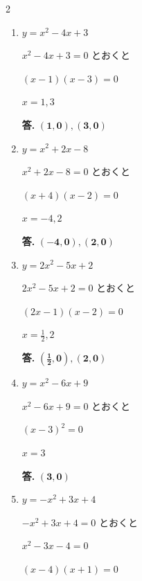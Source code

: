 \documentclass[a4paper, 11pt]{jsarticle}
\begin{document}
\begin{multicols*}{2}
\begin{enumerate}[label=(\arabic*)]
    \item $y = x^2 - 4x + 3$
    
    {\color{red}
    $x^2 - 4x + 3 = 0$ とおくと
    
    $(x - 1)(x - 3) = 0$
    
    $x = 1, 3$
    
    \textbf{答.} $\boldsymbol{(1, 0), (3, 0)}$
    }
    \vspace*{\fill}

    \item $y = x^2 + 2x - 8$
    
    {\color{red}
    $x^2 + 2x - 8 = 0$ とおくと
    
    $(x + 4)(x - 2) = 0$
    
    $x = -4, 2$
    
    \textbf{答.} $\boldsymbol{(-4, 0), (2, 0)}$
    }
    \vspace*{\fill}

    \item $y = 2x^2 - 5x + 2$
    
    {\color{red}
    $2x^2 - 5x + 2 = 0$ とおくと
    
    $(2x - 1)(x - 2) = 0$
    
    $x = \frac{1}{2}, 2$
    
    \textbf{答.} $\boldsymbol{\left(\frac{1}{2}, 0\right), (2, 0)}$
    }
    \vspace*{\fill}

    \item $y = x^2 - 6x + 9$
    
    {\color{red}
    $x^2 - 6x + 9 = 0$ とおくと
    
    $(x - 3)^2 = 0$
    
    $x = 3$
    
    \textbf{答.} $\boldsymbol{(3, 0)}$
    }
    \vspace*{\fill}

    \item $y = -x^2 + 3x + 4$
    
    {\color{red}
    $-x^2 + 3x + 4 = 0$ とおくと
    
    $x^2 - 3x - 4 = 0$
    
    $(x - 4)(x + 1) = 0$
    
}
\end{enumerate}
\end{multicols*}
\end{document}
